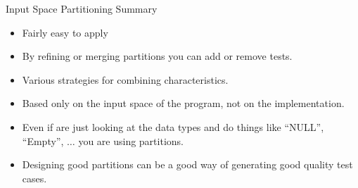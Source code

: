 \documentclass{beamer}
\begin{document}
\begin{frame}{Input Space Partitioning Summary}
  \begin{itemize}
  \item Fairly easy to apply
  \item By refining or merging partitions  you can add or remove
    tests.
  \item Various strategies for combining characteristics.
  \item Based only on the input space of the program, not on the
    implementation.
  \item Even if are just looking at the data types and do things like
    ``NULL'', ``Empty'', $\ldots$ you are using partitions.
  \item Designing good partitions can be a good way of generating good
    quality test cases. 
  \end{itemize}

\end{frame}
\end{document}
